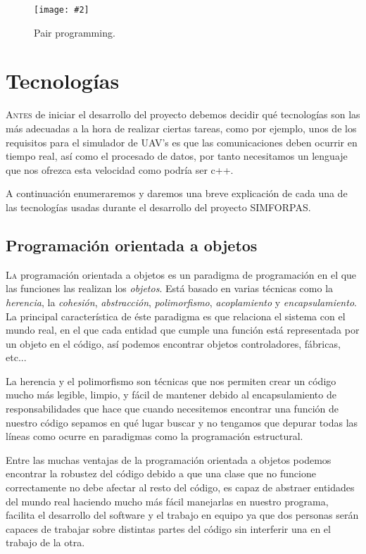\documentclass[12pt,a4paper,spanish]{book} %
\newcommand{\imgCentradaMed}[3]{
\begin{figure}[H]
\begin{center}
\texttt{[image: \#2]}
\caption{#3}
\label{#1}
\end{center}
\end{figure}
}
\begin{document}
\imgCentradaMed{fig.2.4}{img/pair.eps}{Pair programming.}

\section{Tecnologías}

\lettrine{A}{ntes} de iniciar el desarrollo del proyecto debemos decidir qué tecnologías son las más adecuadas a la hora de realizar ciertas tareas, como por ejemplo, unos de los requisitos para el simulador de UAV's es que las comunicaciones deben ocurrir en tiempo real, así como el procesado de datos, por tanto necesitamos un lenguaje que nos ofrezca esta velocidad como podría ser c++.

A continuación enumeraremos y daremos una breve explicación de cada una de las tecnologías usadas durante el desarrollo del proyecto SIMFORPAS.

\subsection{Programación orientada a objetos}

\lettrine{L}{a} programación orientada a objetos es un paradigma de programación en el que las funciones las realizan los \emph{objetos}. Está basado en varias técnicas como la \emph{herencia}, la \emph{cohesión}, \emph{abstracción}, \emph{polimorfismo}, \emph{acoplamiento} y \emph{encapsulamiento}. La principal característica de éste paradigma es que relaciona el sistema con el mundo real, en el que cada entidad que cumple una función está representada por un objeto en el código, así podemos encontrar objetos controladores, fábricas, etc...

La herencia y el polimorfismo son técnicas que nos permiten crear un código mucho más legible, limpio, y fácil de mantener debido al encapsulamiento de responsabilidades que hace que cuando necesitemos encontrar una función de nuestro código sepamos en qué lugar buscar y no tengamos que depurar todas las líneas como ocurre en paradigmas como la programación estructural. 

Entre las muchas ventajas de la programación orientada a objetos podemos encontrar la robustez del código debido a que una clase que no funcione correctamente no debe afectar al resto del código, es capaz de abstraer entidades del mundo real haciendo mucho más fácil manejarlas en nuestro programa, facilita el desarrollo del software y el trabajo en equipo ya que dos personas serán capaces de trabajar sobre distintas partes del código sin interferir una en el trabajo de la otra.
\end{document}
